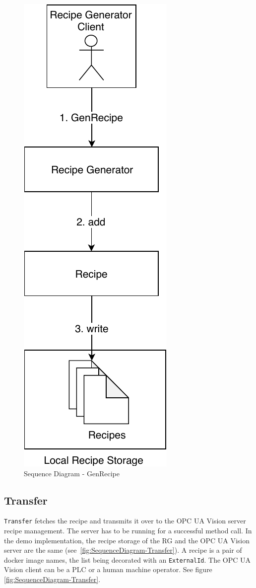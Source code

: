 \begin{figure}[ht]
	\centering
  \includegraphics[height=0.5\textheight]{img/SequenceDiagram-GenRecipe.pdf}
	\caption{Sequence Diagram - GenRecipe}
	\label{fig:SequenceDiagram-GenRecipe}
\end{figure}

\subsection{Transfer}
\texttt{Transfer} fetches the recipe and transmits it over to the OPC UA Vision server recipe management. The server has to be running for a successful method call. In the demo implementation, the recipe storage of the RG and the OPC UA Vision server are the same (see~\ref{fig:SequenceDiagram-Transfer}). A recipe is a pair of docker image names, the list being decorated with an \texttt{ExternalId}. The OPC UA Vision client can be a PLC or a human machine operator. See figure \ref{fig:SequenceDiagram-Transfer}.

